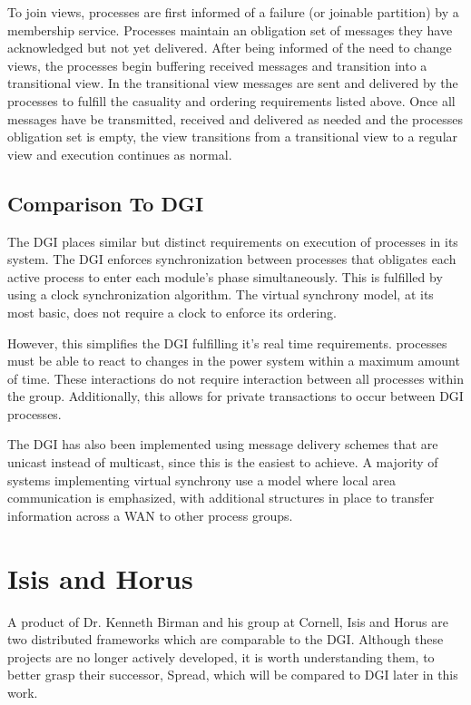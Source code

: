 To join views, processes are first informed of a failure (or joinable partition) 
by a membership service. Processes maintain an obligation set of messages they
have acknowledged but not yet delivered. After being informed of the need to
change views, the processes begin buffering received messages and transition
into a transitional view. In the transitional view messages are sent and
delivered by the processes to fulfill the casuality and ordering requirements
listed above. Once all messages have be transmitted, received and delivered as
needed and the processes obligation set is empty, the view transitions from a
transitional view to a regular view and execution continues as normal.

\subsection{Comparison To DGI}

The DGI places similar but distinct requirements on execution of processes in
its system. The DGI enforces synchronization between processes that obligates
each active process to enter each module's phase simultaneously. This is
fulfilled by using a clock synchronization algorithm. The virtual synchrony
model, at its most basic, does not require a clock to enforce its ordering.

However, this simplifies the DGI fulfilling it's real time requirements. 
processes must be able to react to changes in the power system within a
maximum amount of time. These interactions do not require interaction between
all processes within the group. Additionally, this allows for private
transactions to occur between DGI processes.

The DGI has also been implemented using message delivery schemes that are
unicast instead of multicast, since this is the easiest to achieve. A
majority of systems implementing virtual synchrony use a model where local
area communication is emphasized, with additional structures in place to
transfer information across a WAN to other process groups.

\section{Isis and Horus}

A product of Dr. Kenneth Birman and his group at Cornell, Isis and Horus are
two distributed frameworks which are comparable to the DGI. Although these
projects are no longer actively developed, it is worth understanding them,
to better grasp their successor, Spread, which will be compared to DGI later
in this work.

